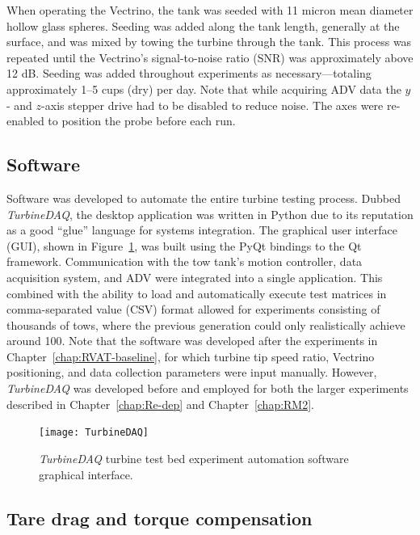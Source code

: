 When operating the Vectrino, the tank was seeded with 11 micron mean diameter
hollow glass spheres. Seeding was added along the tank length, generally at the
surface, and was mixed by towing the turbine through the tank. This process was
repeated until the Vectrino's signal-to-noise ratio (SNR) was approximately
above 12 dB. Seeding was added throughout experiments as necessary---totaling
approximately 1--5 cups (dry) per day. Note that while acquiring ADV data the
$y$- and $z$-axis stepper drive had to be disabled to reduce noise. The axes
were re-enabled to position the probe before each run.


\subsection{Software}

Software was developed to automate the entire turbine testing process. Dubbed
\textit{TurbineDAQ}, the desktop application was written in Python due to its
reputation as a good ``glue'' language for systems integration. The graphical
user interface (GUI), shown in Figure~\ref{fig:TurbineDAQ}, was built using the
PyQt bindings to the Qt framework. Communication with the tow tank's motion
controller, data acquisition system, and ADV were integrated into a single
application. This combined with the ability to load and automatically execute
test matrices in comma-separated value (CSV) format allowed for experiments
consisting of thousands of tows, where the previous generation could only
realistically achieve around 100. Note that the software was developed after the
experiments in Chapter~\ref{chap:RVAT-baseline}, for which turbine tip speed
ratio, Vectrino positioning, and data collection parameters were input manually.
However, \textit{TurbineDAQ} was developed before and employed for both the
larger experiments described in Chapter~\ref{chap:Re-dep} and
Chapter~\ref{chap:RM2}.

\begin{figure}
    \centering
    
    \texttt{[image: TurbineDAQ]}
    
    \caption{\textit{TurbineDAQ} turbine test bed experiment automation software
        graphical interface.}
    
    \label{fig:TurbineDAQ}
\end{figure}


\subsection{Tare drag and torque compensation} 

